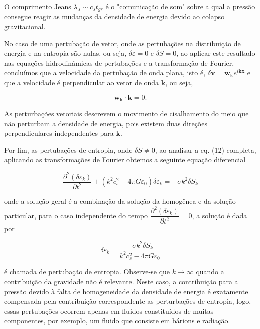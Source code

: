 O comprimento Jeans $\lambda_J \sim c_s t_{gr} $ é o "comunicação de som" sobre a qual a pressão consegue reagir as mudanças da densidade de energia devido ao colapso gravitacional.

No caso de uma pertubação de vetor, onde as pertubações na distribuição de energia e na entropia são nulas, ou seja, $ \delta\varepsilon = 0 $ e $ \delta S = 0$, ao aplicar este resultado nas equações hidrodinâmicas de pertubações e a transformação de Fourier, concluímos que a velocidade da pertubação de onda plana, isto é, $\delta\mathbf{v} = \mathbf{w_k} e^{i\mathbf{k}\mathbf{x}}$ e que a velocidade é perpendicular ao vetor de onda $\mathbf{k}$, ou seja,

\begin{equation}\label{eq17}
	\mathbf{w_k} \cdot \mathbf{k} = 0.
\end{equation}

 As perturbações vetoriais descrevem o movimento de cisalhamento do meio que não perturbam a densidade de energia, pois existem duas direções perpendiculares independentes para $\mathbf{k}$.
 
 Por fim, as pertubações de entropia, onde $ \delta S \neq 0$, ao analisar a eq. (12) completa, aplicando as transformações de Fourier obtemos a seguinte equação diferencial 
 
\begin{equation}\label{eq18}
 	\dfrac{\partial^2 (\delta\varepsilon_k )}{\partial t^2} +(k^2c^2_s - 4\pi G\varepsilon_0)\delta\varepsilon_k  = -\sigma k^2 \delta S_k
\end{equation} 
 
 onde a solução geral é a combinação da solução da homogênea e da solução particular, para o caso independente do tempo $  \dfrac{\partial^2 (\delta\varepsilon_k )}{\partial t^2}  = 0 $, a solução é dada por 
 
\begin{equation}\label{eq19}
	\delta\varepsilon_k  = \dfrac{ -\sigma k^2 \delta S_k}{k^2c^2_s - 4\pi G\varepsilon_0}
\end{equation}

é chamada de pertubação de entropia. Observe-se que $k \to \infty$ quando a contribuição da gravidade não é relevante. Neste caso, a contribuição para a pressão devido à falta de homogeneidade da densidade de energia é exatamente compensada pela contribuição correspondente as perturbações de entropia, logo, essas pertubações ocorrem apenas em fluidos constituídos de muitas componentes, por exemplo, um fluido que consiste em bárions e radiação.

